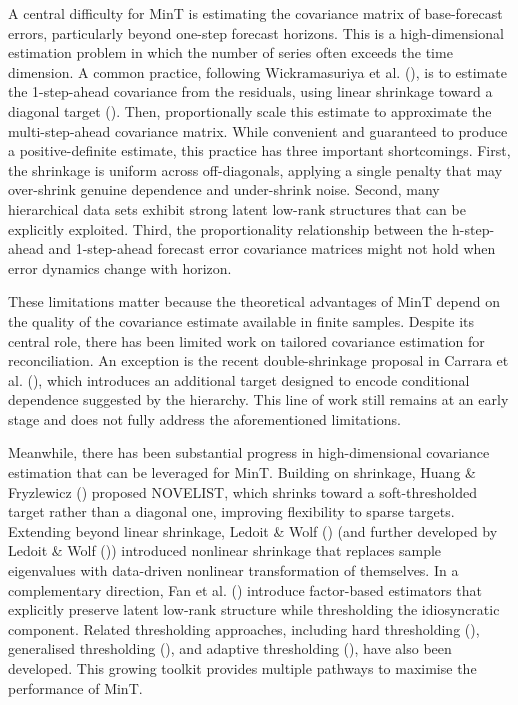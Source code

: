 \documentclass[
  11pt,
  letterpaper,
  DIV=11,
  numbers=noendperiod,
  titlepage]{scrartcl}
\begin{document}
A central difficulty for MinT is estimating the covariance matrix of
base-forecast errors, particularly beyond one-step forecast horizons.
This is a high-dimensional estimation problem in which the number of
series often exceeds the time dimension. A common practice, following
Wickramasuriya et al. (), is
to estimate the 1-step-ahead covariance from the residuals, using linear
shrinkage toward a diagonal target
(). Then,
proportionally scale this estimate to approximate the multi-step-ahead
covariance matrix. While convenient and guaranteed to produce a
positive-definite estimate, this practice has three important
shortcomings. First, the shrinkage is uniform across off-diagonals,
applying a single penalty that may over-shrink genuine dependence and
under-shrink noise. Second, many hierarchical data sets exhibit strong
latent low-rank structures that can be explicitly exploited. Third, the
proportionality relationship between the h-step-ahead and 1-step-ahead
forecast error covariance matrices might not hold when error dynamics
change with horizon.

These limitations matter because the theoretical advantages of MinT
depend on the quality of the covariance estimate available in finite
samples. Despite its central role, there has been limited work on
tailored covariance estimation for reconciliation. An exception is the
recent double-shrinkage proposal in Carrara et al.
(), which introduces an additional
target designed to encode conditional dependence suggested by the
hierarchy. This line of work still remains at an early stage and does
not fully address the aforementioned limitations.

Meanwhile, there has been substantial progress in high-dimensional
covariance estimation that can be leveraged for MinT. Building on
shrinkage, Huang \& Fryzlewicz ()
proposed NOVELIST, which shrinks toward a soft-thresholded target rather
than a diagonal one, improving flexibility to sparse targets. Extending
beyond linear shrinkage, Ledoit \& Wolf
() (and further developed by Ledoit \&
Wolf ()) introduced nonlinear
shrinkage that replaces sample eigenvalues with data-driven nonlinear
transformation of themselves. In a complementary direction, Fan et al.
() introduce factor-based estimators that
explicitly preserve latent low-rank structure while thresholding the
idiosyncratic component. Related thresholding approaches, including hard
thresholding (),
generalised thresholding (), and adaptive thresholding (), have also been developed. This growing toolkit provides multiple
pathways to maximise the performance of MinT.
\end{document}
